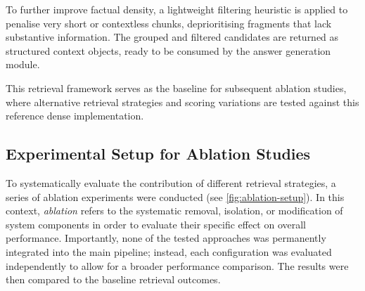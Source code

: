 \begin{spacing}{1.5}
To further improve factual density, a lightweight filtering heuristic is applied to penalise very short or contextless chunks, deprioritising fragments that lack substantive information. The grouped and filtered candidates are returned as structured context objects, ready to be consumed by the answer generation module. 

This retrieval framework serves as the baseline for subsequent ablation studies, where alternative retrieval strategies and scoring variations are tested against this reference dense implementation.

\subsection{Experimental Setup for Ablation Studies}\label{sec:exp_ablation}
To systematically evaluate the contribution of different retrieval strategies, a series of ablation experiments were conducted (see \autoref{fig:ablation-setup}). In this context, \textit{ablation} refers to the systematic removal, isolation, or modification of system components in order to evaluate their specific effect on overall performance. Importantly, none of the tested approaches was permanently integrated into the main pipeline; instead, each configuration was evaluated independently to allow for a broader performance comparison. The results were then compared to the baseline retrieval outcomes.\\


\end{spacing}
